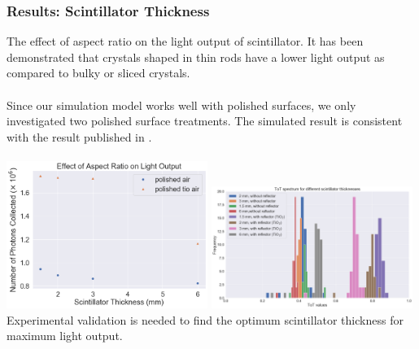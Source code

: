 \documentclass[xcolor=x11names, compress, handout]{beamer}
\renewcommand{\(}{\begin{columns}}
\renewcommand{\)}{\end{columns}}
\newcommand{\<}[1]{\begin{column}{#1}}
\renewcommand{\>}{\end{column}}
\begin{document}
\begin{frame}
  \frametitle{Results: Scintillator Thickness}
  \scriptsize
  The effect of aspect ratio on the light output of scintillator. It has been demonstrated that crystals shaped in thin rods have a lower light output as compared to bulky or sliced crystals. \cite{pauwels_2012} \\
  \ \\
  Since our simulation model works well with polished surfaces, we only investigated two polished surface treatments. The simulated result is consistent with the result published in \cite{pauwels_2012}. \\
  \ \\
  \centering
  \includegraphics[width=0.49\textwidth, height=0.49\textheight]{images/light_yield_thicknesses.png} 
  \includegraphics[width=0.49\textwidth, height=0.49\textheight]{images/ToT_thicknesses.png}
  \flushleft Experimental validation is needed to find the optimum scintillator thickness for maximum light output.
\end{frame}
\end{document}

